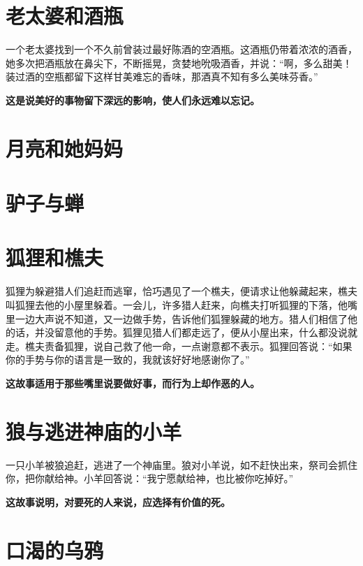 \section{老太婆和酒瓶}

一个老太婆找到一个不久前曾装过最好陈酒的空酒瓶。这酒瓶仍带着浓浓的酒香，她多次把酒瓶放在鼻尖下，不断摇晃，贪婪地吮吸酒香，并说：“啊，多么甜美！装过酒的空瓶都留下这样甘美难忘的香味，那酒真不知有多么美味芬香。”

{\bfseries \color{red}这是说美好的事物留下深远的影响，使人们永远难以忘记。}

\section{月亮和她妈妈}



{\bfseries \color{red}}

\section{驴子与蝉}



{\bfseries \color{red}}

\section{狐狸和樵夫}

狐狸为躲避猎人们追赶而逃窜，恰巧遇见了一个樵夫，便请求让他躲藏起来，樵夫叫狐狸去他的小屋里躲着。一会儿，许多猎人赶来，向樵夫打听狐狸的下落，他嘴里一边大声说不知道，又一边做手势，告诉他们狐狸躲藏的地方。猎人们相信了他的话，并没留意他的手势。狐狸见猎人们都走远了，便从小屋出来，什么都没说就走。樵夫责备狐狸，说自己救了他一命，一点谢意都不表示。狐狸回答说：“如果你的手势与你的语言是一致的，我就该好好地感谢你了。”

{\bfseries \color{red}这故事适用于那些嘴里说要做好事，而行为上却作恶的人。}

\section{狼与逃进神庙的小羊}

一只小羊被狼追赶，逃进了一个神庙里。狼对小羊说，如不赶快出来，祭司会抓住你，把你献给神。小羊回答说：“我宁愿献给神，也比被你吃掉好。”

{\bfseries \color{red}这故事说明，对要死的人来说，应选择有价值的死。}

\section{口渴的乌鸦}

